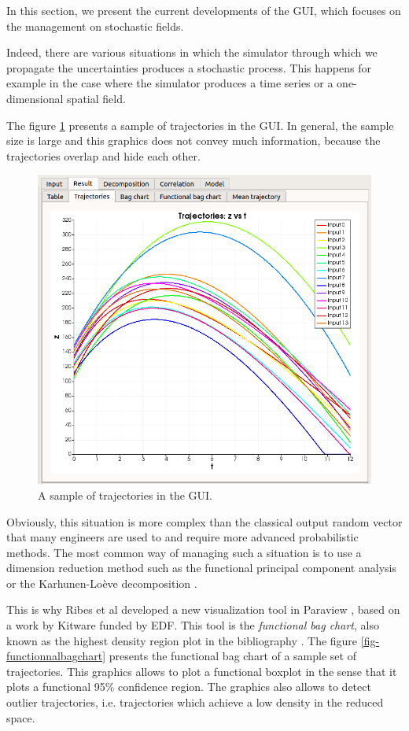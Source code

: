\documentclass{uncecomp2019}
\begin{document}
In this section, we present the current developments of the GUI, which focuses on the 
management on stochastic fields. 

Indeed, there are various situations in which the simulator through which we propagate the 
uncertainties produces a stochastic process. 
This happens for example in the case where the simulator produces a time series or 
a one-dimensional spatial field. 

The figure \ref{fig-trajectories} presents a sample of trajectories in the GUI. 
In general, the sample size is large and this graphics does not convey much information, 
because the trajectories overlap and hide each other. 

\begin{figure}
\centering
\includegraphics[width=\textwidth]{figures/central_tendency_trajectories-focus.png}
\caption{A sample of trajectories in the GUI.}
\label{fig-trajectories}
\end{figure}

Obviously, this situation is more complex than the classical output random 
vector that many engineers are used to and require more advanced 
probabilistic methods. 
The most common way of managing such a situation is to use a 
dimension reduction method such as the functional principal component analysis or the 
Karhunen-Loève decomposition \cite{Silverman2005}. 

This is why Ribes et al \cite{Ribes2014} developed a new visualization tool in Paraview \cite{PVurl}, based on a 
work by Kitware funded by EDF. 
This tool is the \emph{functional bag chart}, also known as the highest density region 
plot in the bibliography \cite{Hyndman1996}. 
The figure \ref{fig-functionnalbagchart} presents the functional bag chart of a sample 
set of trajectories. 
This graphics allows to plot a functional boxplot in the sense that it plots a functional 95\% confidence 
region. 
The graphics also allows to detect outlier trajectories, i.e. trajectories which achieve a low 
density in the reduced space. 
\end{document}
